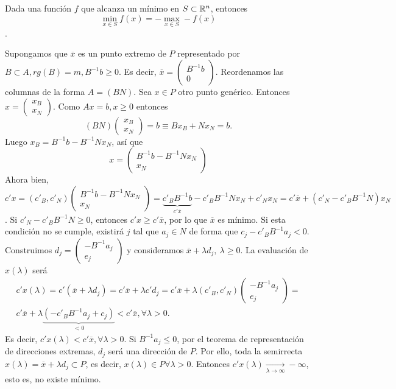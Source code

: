 \documentclass[PM.tex]{subfiles}
\begin{document}
\begin{nota}
Dada una función $f$ que alcanza un mínimo en $S\subset\mathbb{R}^n$, entonces \[\min_{x\in S} f(x)= -\max_{x\in S}-f(x)\].
\end{nota}


Supongamos que $\overline{x}$ es un punto extremo de $P$ representado por $B\subset A, rg(B)=m, B^{-1}b\geq 0$. Es decir, $\overline{x}=\begin{pmatrix}
B^{-1}b\\
0
\end{pmatrix}$. Reordenamos las columnas de la forma $A=(B N)$. Sea $x\in P$ otro punto genérico. Entonces $x=\begin{pmatrix}
x_B\\
x_N
\end{pmatrix}$. Como $Ax=b, x\geq 0$ entonces
\[ (B N) \begin{pmatrix}
x_B\\
x_N
\end{pmatrix}= b\equiv Bx_B + Nx_N=b.\]
Luego $x_B=B^{-1}b-B^{-1}Nx_N$, así que 
\[ x=\begin{pmatrix}
B^{-1}b-B^{-1}Nx_N\\
x_N
\end{pmatrix}\]
Ahora bien, \[c'x=(c'_B, c'_N)\begin{pmatrix}
B^{-1}b-B^{-1}Nx_N\\
x_N
\end{pmatrix}=\underbrace{c'_B B^{-1}b}_{c'\overline{x}}-c'_B B^{-1}Nx_N+c'_Nx_N=c'\overline{x}+(c'_N-c'_BB^{-1}N)x_N\]. Si $c'_N-c'_BB^{-1}N\geq 0$, entonces $c'x\geq c'\overline{x}$, por lo que $\overline{x}$ es mínimo. Si esta condición no se cumple, existirá $j$ tal que $a_j\in N$ de forma que $c_j-c'_BB^{-1}a_j<0$. Construimos $d_j=\begin{pmatrix}
-B^{-1}a_j\\
e_j
\end{pmatrix}$ y consideramos $\overline{x}+\lambda d_j,\ \lambda\geq 0$. La evaluación de $x(\lambda)$ será 
\begin{gather*}
c'x(\lambda)=c'(\overline{x}+\lambda d_j)=c'\overline{x}+\lambda c'd_j=c'\overline{x}+\lambda(c'_B, c'_N)\begin{pmatrix}
-B^{-1}a_j\\
e_j
\end{pmatrix}=\\
c'\overline{x}+\lambda\underbrace{(-c'_B B^{-1}a_j +c_j)}_{<0}< c'\overline{x}, \forall\lambda >0.
\end{gather*}
Es decir, $c'x(\lambda)<c'\overline{x}, \forall\lambda >0$. Si $B^{-1}a_j\leq 0$, por el teorema de representación de direcciones extremas, $d_j$ será una dirección de $P$. Por ello, toda la semirrecta $x(\lambda)=\overline{x}+\lambda d_j\subset P$, es decir, $x(\lambda)\in P\forall\lambda >0$. Entonces $c'x(\lambda)\underset{\lambda\to\infty}{\longrightarrow} -\infty$, esto es, no existe mínimo.
\end{document}
